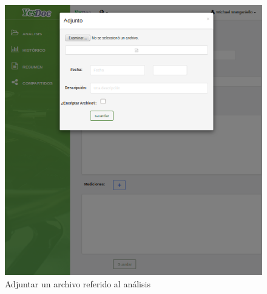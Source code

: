  	
 	\begin{figure}
 		\centering
 		\includegraphics[width=.8\textwidth]{img/manual_de_usuario/mu-adjuntar_archivo}
 		\caption{Adjuntar un archivo referido al análisis}
 		\label{mu-adjuntar_archivo}	
 	\end{figure}
 	
